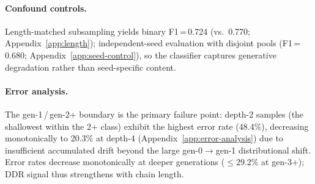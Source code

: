 \paragraph{Confound controls.}
 Length-matched subsampling yields binary F1\,=\,0.724 (vs.\ 0.770; Appendix~\ref{app:length}); independent-seed evaluation with disjoint pools (F1\,=\,0.680; Appendix~\ref{app:seed-control}), so the classifier captures generative degradation rather than seed-specific content.

\paragraph{Error analysis.}
 The gen-1\,/\,gen-2+ boundary is the primary failure point: depth-2 samples (the shallowest within the 2+ class) exhibit the highest error rate (48.4\%), decreasing monotonically to 20.3\% at depth-4 (Appendix~\ref{app:error-analysis}) due to insufficient accumulated drift beyond the large gen-0$\to$gen-1 distributional shift.
Error rates decrease monotonically at deeper generations ($\leq$29.2\% at gen-3+); DDR signal thus strengthens with chain length.

\begin{table}[t]
\centering
\footnotesize
\caption{8-generator LOGO macro-F1 (bootstrap 95\% CIs, $n$\,=\,1{,}000). Binary F1 excludes gen-0. $^{\dagger}$3-class F1 has upward bias from shared gen-0 seeds; independent-seed controls confirm the signal (F1\,=\,0.680; Appendix~\ref{app:seed-control}).}
\label{tab:logo-results}
\end{table}

